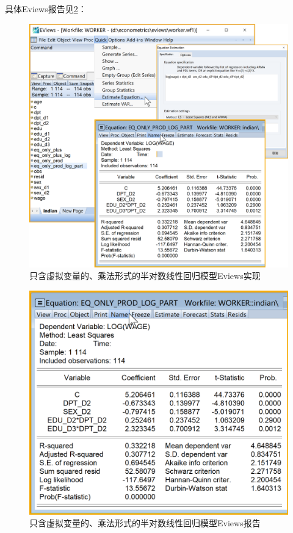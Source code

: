 \documentclass[12pt,(landscape,a4paper),(portrait,a4paper)]{article}
\theoremstyle{definition}
\theoremstyle{definition}
\theoremstyle{definition}
\theoremstyle{remark}
\begin{document}
具体Eviews报告见\ref{fig:only-prod-log-part-report}：

\begin{figure}

{\centering \includegraphics[width=26.85in]{picture/lab8-dummy-model/2-only-prod-log-part} 

}

\caption{只含虚拟变量的、乘法形式的半对数线性回归模型Eviews实现}\label{fig:only-prod-log-part}
\end{figure}

\begin{figure}

{\centering \includegraphics[width=17.74in]{picture/lab8-dummy-model/2-only-prod-log-part-report} 

}

\caption{只含虚拟变量的、乘法形式的半对数线性回归模型Eviews报告}\label{fig:only-prod-log-part-report}
\end{figure}
\end{document}
